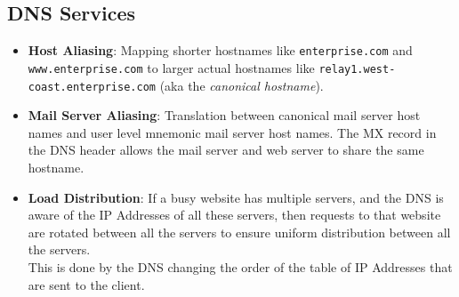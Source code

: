 \documentclass{article}
\theoremstyle{plain}
\theoremstyle{definition}
\begin{document}
\subsection{DNS Services}
\begin{itemize}
    \item \textbf{Host Aliasing}: Mapping shorter hostnames like \texttt{enterprise.com} and \texttt{www.enterprise.com} to larger actual hostnames like \texttt{relay1.west-coast.enterprise.com} (aka the \textit{canonical hostname}). 
    
    \item \textbf{Mail Server Aliasing}: Translation between canonical mail server host names and user level mnemonic mail server host names. The MX record in the DNS header allows the mail server and web server to share the same hostname.
    
    \item \textbf{Load Distribution}: If a busy website has multiple servers, and the DNS is aware of the IP Addresses of all these servers, then requests to that website are rotated between all the servers to ensure uniform distribution between all the servers. \\
    This is done by the DNS changing the order of the table of IP Addresses that are sent to the client. 
\end{itemize}
\end{document}
